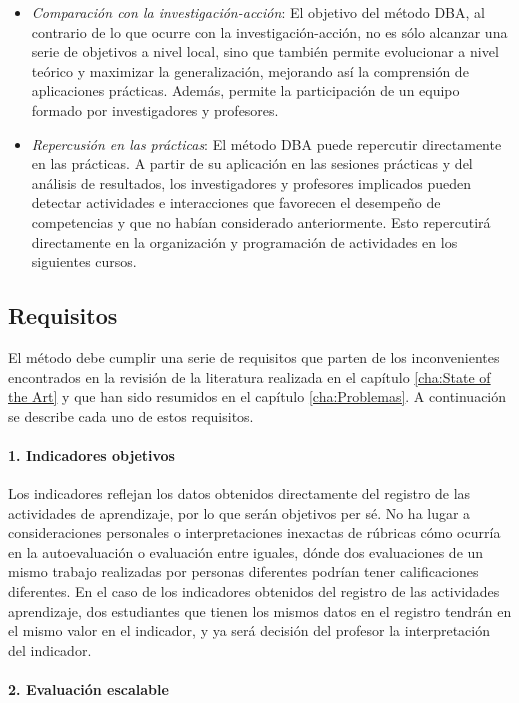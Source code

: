 \begin{itemize}
\item \emph{Comparación con la investigación-acción}: El objetivo del método DBA, al contrario de lo que ocurre con la investigación-acción, no es sólo alcanzar una serie de objetivos a nivel local, sino que también permite evolucionar a nivel teórico y maximizar la generalización, mejorando así la comprensión de aplicaciones prácticas. Además, permite la participación de un equipo formado por investigadores y profesores.
\item \emph{Repercusión en las prácticas}: El método DBA puede repercutir directamente en las prácticas. A partir de su aplicación en las sesiones prácticas y del análisis de resultados, los investigadores y profesores implicados pueden detectar actividades e interacciones que favorecen el desempeño de competencias y que no habían considerado anteriormente. Esto repercutirá directamente en la organización y programación de actividades en los siguientes cursos.
\end{itemize}

\subsection{Requisitos}

El método debe cumplir una serie de requisitos que parten de los inconvenientes encontrados en la revisión de la literatura realizada en el capítulo \ref{cha:State of the Art} y que han sido resumidos en el capítulo \ref{cha:Problemas}. A continuación se describe cada uno de estos requisitos.

\paragraph*{1. Indicadores objetivos}

Los indicadores reflejan los datos obtenidos directamente del registro de las actividades de aprendizaje, por lo que serán objetivos per sé. No ha lugar a consideraciones personales o interpretaciones inexactas de rúbricas cómo ocurría en la autoevaluación o evaluación entre iguales, dónde dos evaluaciones de un mismo trabajo realizadas por personas diferentes podrían tener calificaciones diferentes. En el caso de los indicadores obtenidos del registro de las actividades aprendizaje, dos estudiantes que tienen los mismos datos en el registro tendrán en el mismo valor en el indicador, y ya será decisión del profesor la interpretación del indicador.

\paragraph*{2. Evaluación escalable}

